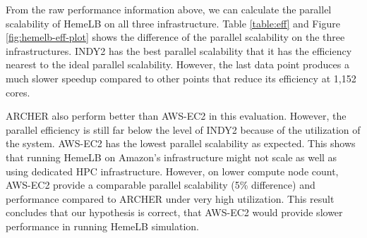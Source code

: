 \vspace{0.5cm}


\noindent%
\begin{minipage}{\linewidth}%
 \label{fig:hemelb-eff-plot}%
\end{minipage}

\vspace{0.5cm}


From the raw performance information above, we can calculate the parallel scalability of HemeLB on all three infrastructure. Table \ref{table:eff} and Figure \ref{fig:hemelb-eff-plot} shows the difference of the parallel scalability on the three infrastructures. INDY2 has the best parallel scalability that it has the efficiency nearest to the ideal parallel scalability. However, the last data point produces a much slower speedup compared to other points that reduce its efficiency at 1,152 cores. 

ARCHER also perform better than AWS-EC2 in this evaluation. However, the parallel efficiency is still far below the level of INDY2 because of the utilization of the system. AWS-EC2 has the lowest parallel scalability as expected. This shows that running HemeLB on Amazon's infrastructure might not scale as well as using dedicated HPC infrastructure. However, on lower compute node count, AWS-EC2 provide a comparable parallel scalability (5\% difference) and performance compared to ARCHER under very high utilization. This result concludes that our hypothesis is correct, that AWS-EC2 would provide slower performance in running HemeLB simulation.  


